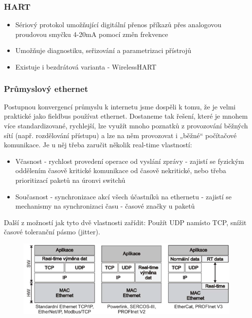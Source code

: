 \subsubsection*{HART}
\begin{itemize}
    \item Sériový protokol umožňující digitální přenos příkazů přes analogovou proudovou smyčku 4-20mA pomocí změn frekvence
    \item Umožňuje diagnostiku, seřizování a parametrizaci přístrojů
    \item Existuje i bezdrátová varianta - WirelessHART
\end{itemize}

\subsubsection*{Průmyslový ethernet}
Postupnou konvergencí průmyslu k internetu jsme dospěli k tomu, že je velmi praktické jako fieldbus používat ethernet. Dostaneme tak řešení, které je mnohem více standardizované, rychlejší, lze využít mnoho poznatků z provozování běžných sítí (např. rozdělování přístupu) a lze na něm provozovat i „běžné“ počítačové komunikace.
Je u něj třeba zaručit několik real-time vlastností:
\begin{itemize}
    \item Včasnost - rychlost provedení operace od vyslání zprávy - zajistí se fyzickým oddělením časově kritické komunikace od časově nekritické, nebo třeba prioritizací paketů na úronvi switchů
    \item Současnost - synchronizace akcí všech účastníků na ethernetu - zajistí se mechanismy na synchronizaci času - časové značky u paketů
\end{itemize}
Další z možností jak tyto dvě vlastnosti zařídit: Použít UDP namísto TCP, snížit časové toleranční pásmo (jitter).

\begin{figure}[h]
    \begin{center}
        \includegraphics[scale = 1]{img/Picture19.png}
    \end{center}
\end{figure}

